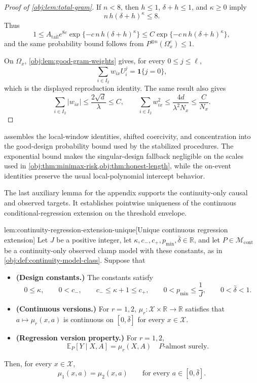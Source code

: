 \documentclass[11pt]{article}
\begin{document}
\begin{proof}[Proof of \cref{obj:lem:total-gram}]
If \(n<8\), then \(h\le1\), \(\delta+h\le1\), and \(\kappa\ge0\) imply
\[
n\,h(\delta+h)^\kappa\le8.
\]
Thus
\[
1\le
A_{\mathrm{tail}}e^{8c}\exp\{-c\,n\,h(\delta+h)^\kappa\}
\le
C\exp\{-c\,n\,h(\delta+h)^\kappa\},
\]
and the same probability bound follows from \(P^{\otimes n}(\Omega_x^c)\le1\). %

On \(\Omega_x\), \cref{obj:lem:good-gram-weights} gives, for every \(0\le j\le\ell\),
\[
\sum_{i\in I_2}w_{ix}U_i^j
=
\mathbf 1\{j=0\},
\]
which is the displayed reproduction identity.  The same result also gives
\[
\sum_{i\in I_2}|w_{ix}|
\le
\frac{2\sqrt d}{\lambda}
\le C,
\qquad
\sum_{i\in I_2}w_{ix}^2
\le
\frac{4d}{\lambda^2N_x}
\le
\frac{C}{N_x}.
\]
\end{proof}

 assembles the local-window identities, shifted coercivity, and concentration into the good-design probability bound used by the stabilized procedures. The exponential bound makes the singular-design fallback negligible on the scales used in \cref{obj:thm:minimax-risk,obj:thm:honest-length}, while the on-event identities preserve the usual local-polynomial intercept behavior.

The last auxiliary lemma for the appendix supports the continuity-only causal and observed targets. It establishes pointwise uniqueness of the continuous conditional-regression extension on the threshold envelope.

\begin{lemmav}{lem:continuity-regression-extension-unique}[Unique continuous regression extension]
Let \(J\) be a positive integer, let \(\kappa,c_-,c_+,p_{\min},\bar\delta\in\mathbb R\), and let \(P\in\mathcal M_{\mathrm{cont}}\) be a continuity-only observed clamp model with these constants, as in \cref{obj:def:continuity-model-class}. Suppose that
\begin{itemize}
\item \textbf{(Design constants.)} The constants satisfy
\[
0\leq \kappa,\qquad
0<c_-,\qquad
c_-\leq \kappa+1\leq c_+,\qquad
0<p_{\min}\leq \frac1J,\qquad
0<\bar\delta<1 .
\]
\item \textbf{(Continuous versions.)} For \(r=1,2\), \(\mu_r:\mathcal X\times\mathbb R\to\mathbb R\) satisfies that \(a\mapsto \mu_r(x,a)\) is continuous on \([0,\bar\delta]\) for every \(x\in\mathcal X\).
\item \textbf{(Regression version property.)} For \(r=1,2\),
\[
\mathbb E_P[Y\mid X,A]=\mu_r(X,A)
\quad\text{\(P\)-almost surely.}
\]
\end{itemize}
Then, for every \(x\in\mathcal X\),
\[
\mu_1(x,a)=\mu_2(x,a)
\qquad\text{for every }a\in[0,\bar\delta].
\]
\end{lemmav}
\end{document}
